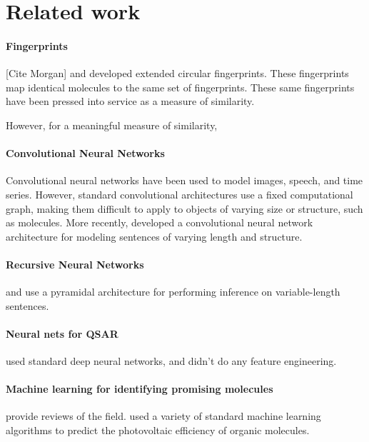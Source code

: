 \documentclass{article}
\begin{document}
\section{Related work}

\paragraph{Fingerprints}

[Cite Morgan] and \citet{ECFP2010} developed extended circular fingerprints.
These fingerprints map identical molecules to the same set of fingerprints.
These same fingerprints have been pressed into service as a measure of similarity.

However, for a meaningful measure of similarity, 

\paragraph{Convolutional Neural Networks}

Convolutional neural networks have been used to model images, speech, and time series\citep{lecun1995convolutional}.
However, standard convolutional architectures use a fixed computational graph, making them difficult to apply to objects of varying size or structure, such as molecules.
More recently, \citet{KalchbrennerACL2014} developed a convolutional neural network architecture for modeling sentences of varying length and structure.

\paragraph{Recursive Neural Networks}

\citet{socher2011semi} and \citet{socher2011dynamic} use a pyramidal architecture for performing inference on variable-length sentences.

\paragraph{Neural nets for QSAR}

\cite{dahl2014multi} used standard deep neural networks, and didn't do any feature engineering.

\paragraph{Machine learning for identifying promising molecules}

\citet{Eckert2007225, bergeron2011modeling} provide reviews of the field.
\citet{tingley2014towards} used a variety of standard machine learning algorithms to predict the photovoltaic efficiency of organic molecules.
\end{document}
